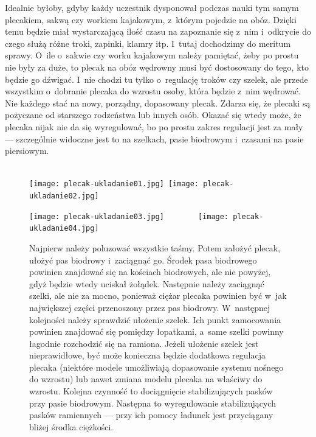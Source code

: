 \documentclass[a5paper,10pt,titlepage,twoside]{article}
\begin{document}
Idealnie byłoby, gdyby każdy uczestnik dysponował podczas nauki tym samym plecakiem, sakwą czy workiem kajakowym, z~którym pojedzie na obóz. Dzięki temu będzie miał wystarczającą ilość czasu na zapoznanie się z~nim i~odkrycie do czego służą różne troki, zapinki, klamry itp. I~tutaj dochodzimy do meritum sprawy. O~ile o~sakwie czy worku kajakowym należy pamiętać, żeby po prostu nie były za duże, to plecak na obóz wędrowny musi być dostosowany do tego, kto będzie go dźwigać. I~nie chodzi tu tylko o~regulację troków czy szelek, ale przede wszystkim o~dobranie plecaka do wzrostu osoby, która będzie z~nim wędrować. Nie każdego stać na nowy, porządny, dopasowany plecak. Zdarza się, że plecaki są pożyczane od starszego rodzeństwa lub innych osób. Okazać się wtedy może, że plecaka nijak nie da się wyregulować, bo po prostu zakres regulacji jest za mały --- szczególnie widoczne jest to na szelkach, pasie biodrowym i~czasami na pasie piersiowym.
\\
\\
\begin{figure}[htp]
\centering
\texttt{[image: plecak-ukladanie01.jpg]}~\texttt{[image: plecak-ukladanie02.jpg]}

\texttt{[image: plecak-ukladanie03.jpg]}~~~~~~~~\texttt{[image: plecak-ukladanie04.jpg]}
\caption[Capin for OF]{Najpierw należy poluzować wszystkie taśmy. Potem założyć plecak, ułożyć pas biodrowy i~zaciągnąć go. Środek pasa biodrowego powinien znajdować się na kościach biodrowych, ale nie powyżej, gdyż będzie wtedy uciskał żołądek. Następnie należy zaciągnąć szelki, ale nie za mocno, ponieważ ciężar plecaka powinien być w~jak największej części przenoszony przez pas biodrowy. W~następnej kolejności należy sprawdzić ułożenie szelek. Ich punkt zamocowania powinien znajdować się pomiędzy łopatkami, a~same szelki powinny łagodnie rozchodzić się na ramiona. Jeżeli ułożenie szelek jest nieprawidłowe, być może konieczna będzie dodatkowa regulacja plecaka (niektóre modele umożliwiają dopasowanie systemu nośnego do wzrostu) lub nawet zmiana modelu plecaka na właściwy do wzrostu. Kolejna czynność to dociągnięcie stabilizujących pasków przy pasie biodrowym. Następna to wyregulowanie stabilizujących pasków ramiennych --- przy ich pomocy ładunek jest przyciągany bliżej środka ciężkości.\footnotemark}
\label{fig:dopasowywanie1}
\end{figure}
\end{document}
